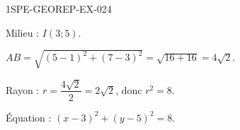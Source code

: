 \begin{corrige}{1SPE-GEOREP-EX-024}


Milieu : $I(3 ; 5)$.

$AB = \sqrt{(5-1)^2 + (7-3)^2} = \sqrt{16 + 16} = 4\sqrt{2}$.

Rayon : $r = \dfrac{4\sqrt{2}}{2} = 2\sqrt{2}$, donc $r^2 = 8$.

Équation : $\boxed{(x - 3)^2 + (y - 5)^2 = 8}$.

\end{corrige}
